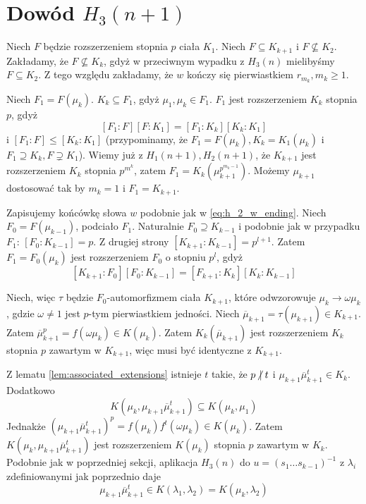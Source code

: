 \section{Dowód $H_3(n+1)$}
Niech $F$ będzie rozszerzeniem stopnia $p$ ciała $K_1$. Niech $F
\subseteq K_{k+1}$ i $F \not \subseteq K_2$. Zakładamy, że $F \not \subseteq
K_k$, gdyż w przeciwnym wypadku z $H_3(n)$ mielibyśmy $F \subseteq K_2$.
Z tego względu zakładamy, że $w$ kończy się pierwiastkiem $r_{m_k}, m_k \geq 1$.

Niech $F_1 = F \left( \mu_k \right)$. $K_k \subseteq F_1$, gdyż $\mu_1, \mu_k
\in F_1$. $F_1$ jest rozszerzeniem $K_k$ stopnia $p$, gdyż
\[
\left[F_1:F\right]\left[F:K_1 \right] =
\left[F_1:K_k\right]\left[K_k:K_1\right]
\]
i $\left[F_1:F\right] \leq \left[K_k:K_1\right]$ (przypominamy, że $F_1 =
F\left(\mu_k\right), K_k = K_1\left(\mu_k\right)$ i $F_1 \supseteq K_k, F
\supsetneq K_1$).
Wiemy już z $H_1(n+1), H_2(n+1)$, że $K_{k+1}$ jest rozszerzeniem $K_k$
stopnia $p^{m^k}$, zatem $F_1 = K_k \left(\mu_{k+1}^{p^{m_k -1}} \right)$.
Możemy $\mu_{k+1}$ dostosować tak by $m_k = 1$ i $F_1 = K_{k+1}$.

Zapisujemy końcówkę słowa $w$ podobnie jak w \ref{eq:h_2_w_ending}. Niech $F_0 =
F \left( \mu_{k-1} \right)$, podciało $F_1$. Naturalnie $F_0 \supseteq K_{k-1}$
i podobnie jak w przypadku $F_1$: $\left[F_0:K_{k-1} \right] = p$. Z drugiej
strony $\left[ K_{k+1} : K_{k-1} \right] = p^{l+1}$.  Zatem $F_1 = F_0
\left(\mu_k \right)$ jest rozszerzeniem $F_0$ o stopniu $p^l$, gdyż
\[
  \left[K_{k+1} : F_0\right]\left[F_0:K_{k-1} \right] =
  \left[F_{k+1}:K_k\right]\left[K_k:K_{k-1}\right]
\]

Niech, więc $\tau$ będzie $F_0$-automorfizmem ciała $K_{k+1}$, które odwzorowuje
$\mu_k \rightarrow \omega \mu_k$, gdzie $\omega \neq 1$ jest $p$-tym
pierwiastkiem jedności. Niech $\overline{\mu}_{k+1} = \tau \left( \mu_{k+1}
\right) \in K_{k+1}$. Zatem $\overline{\mu}_{k+1}^p = f \left( \omega \mu_k
\right) \in K \left( \mu_k \right)$.
Zatem $K_k \left(\overline{\mu}_{k+1} \right)$ jest rozszerzeniem $K_k$
stopnia $p$ zawartym w $K_{k+1}$, więc musi być identyczne z $K_{k+1}$.

Z lematu \ref{lem:associated_extensions} istnieje $t$ takie, że 
$p \! \not \!\, | \; t$ i
$\mu_{k+1} \overline{\mu}_{k+1}^t \in K_k$. Dodatkowo
\[ K \left( \mu_k, \mu_{k+1} \overline{\mu}_{k+1}^t \right)
  \subseteq
  K \left( \mu_k, \mu_1 \right)
\]
Jednakże $\left(\mu_{k+1}\overline{\mu}_{k+1}^t\right)^p =
f\left(\mu_k\right)f^t\left(\omega \mu_k\right) \in K\left(\mu_k\right)$. Zatem
$K \left( \mu_k, \mu_{k+1} \overline{\mu}_{k+1}^t \right)$
jest rozszerzeniem $K\left(\mu_k\right)$ stopnia $p$ zawartym w
$K_k$. Podobnie jak w poprzedniej sekcji, aplikacja $H_3(n)$ do $u = \left(s_1
\ldots s_{k-1}\right)^{-1}$ z $\lambda_i$ zdefiniowanymi jak poprzednio daje
\[ \mu_{k+1}\overline{\mu}^t_{k+1} \in K\left(\lambda_1, \lambda_2\right) =
K\left(\mu_k, \lambda_2\right)\]

